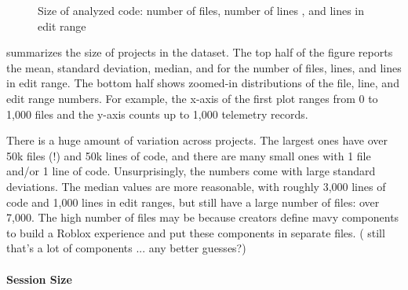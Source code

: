 \documentclass[english,submission,cleveref]{programming}
\begin{document}
\begin{figure}[t]
\begin{tabular}{l@{}r@{~}l@{}r@{~}l@{}r@{~}l}
  \end{tabular}

  \caption{Size of analyzed code: number of files, number of lines , and lines in edit range}
  \label{f:codebase-size}
\end{figure}

 summarizes the size of projects in the dataset.
The top half of the figure reports the mean, standard deviation, median,
and  for the number of files, lines, and lines in edit range.
The bottom half shows zoomed-in distributions of the file, line, and edit range
numbers.
For example, the x-axis of the first plot ranges from 0 to 1,000 files and
the y-axis counts up to 1,000 telemetry records.

There is a huge amount of variation across projects.
The largest ones have over 50k files (!) and 50k lines of code, and %
there are many small ones with 1 file and/or 1 line of code.
Unsurprisingly, the numbers come with large standard deviations.
The median values are more reasonable, with roughly 3,000 lines of code
and 1,000 lines in edit ranges, but still have a large number of files: over 7,000.
The high number of files may be because creators define mavy components to
build a Roblox experience and put these components in separate files.
(\FILL{} still that's a lot of components ... any better guesses?)


\paragraph{Session Size}
\end{document}
